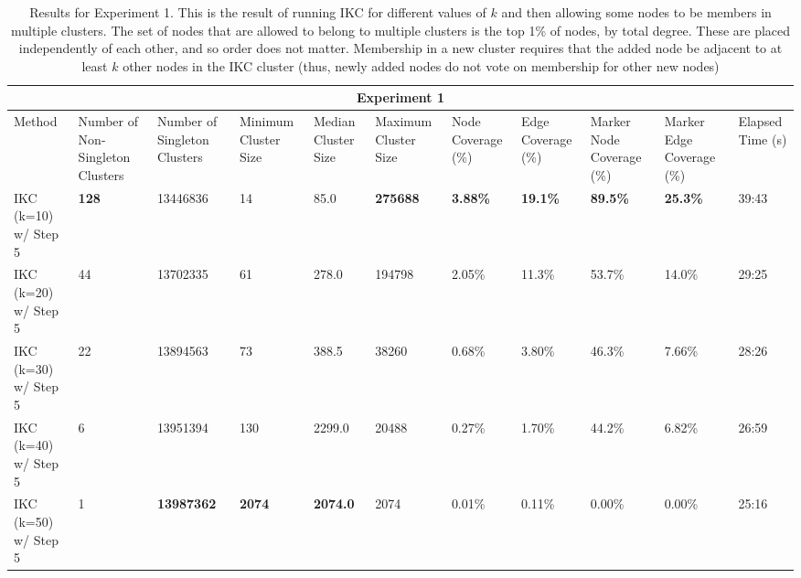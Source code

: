 \documentclass{article}
\begin{document}
\begin{table}[h!]
\centering
\begin{small}
	\begin{tabular}{ |p{0.95cm}||p{1.25cm}|p{1.25cm}||p{1.20cm}|p{1.20cm}|p{1.20cm}||p{1.25cm}|p{1.25cm}|| p{1.25cm}|p{1.25cm}||p{0.95cm}| }
		\hline
		\multicolumn{11}{|c|}{Experiment 1} \\
		\hline
		Method & Number of Non-Singleton Clusters & Number of Singleton Clusters & Minimum Cluster Size &  Median Cluster Size & Maximum Cluster Size & Node Coverage (\%)& Edge Coverage  (\%)& Marker Node Coverage  (\%)& Marker Edge Coverage  (\%) & Elapsed Time (s)\\
		\hline
		IKC (k=10) w/ Step 5   &  \textbf{128}    & 13446836 &   14 & 85.0 & \textbf{275688} & \textbf{3.88\%} & \textbf{19.1\% }& \textbf{89.5\% }& \textbf{25.3\%} & 39:43\\ \hline
		IKC (k=20)  w/ Step 5 &  44    & 13702335 &   61 & 278.0 & 194798 & 2.05\% & 11.3\% & 53.7\% & 14.0\% & 29:25\\ \hline
		IKC (k=30)  w/ Step 5 &  22    & 13894563 &   73 & 388.5 & 38260 & 0.68\% & 3.80\% & 46.3\% & 7.66\% & 28:26\\ \hline
		IKC (k=40)  w/ Step 5 &  6    & 13951394 &   130 & 2299.0 & 20488 & 0.27\% & 1.70\% & 44.2\% & 6.82\% & 26:59\\ \hline
		IKC (k=50) w/ Step 5  &  1    & \textbf{13987362} &   \textbf{2074} & \textbf{2074.0} & 2074 & 0.01\% & 0.11\% & 0.00\% & 0.00\% & 25:16\\ \hline
		\hline
	\end{tabular}
	\end{small}
	\caption{Results for Experiment 1. This is the result of running IKC for different values of $k$ and then allowing some nodes to be members in multiple clusters. The set of nodes that are allowed to belong to multiple clusters is the top 1\% of nodes, by total degree. These are placed independently of each other, and so order does not matter.  Membership in a new cluster requires that the added node be adjacent to at least $k$ other nodes in the IKC cluster (thus, newly added nodes do not vote on membership for other new nodes)}
	\label{table:expt1}
\end{table}
\end{document}
